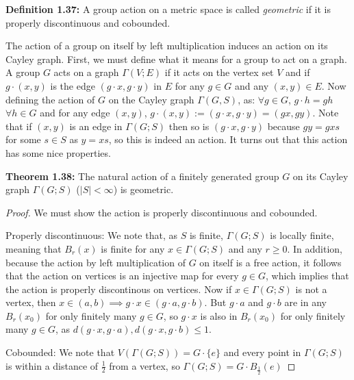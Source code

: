\documentclass[12pt]{article}
\newcommand{\vs}{\vskip10pt}
\begin{document}
	\vs 
	
	\textbf{Definition 1.37: } A group action on a metric space is called \textit{geometric} if it is properly discontinuous and cobounded.
	
	\vs 
	
	The action of a group on itself by left multiplication induces an action on its Cayley graph. First, we must define what it means for a group to act on a graph. A group $G$ acts on a graph $\Gamma(V;E)$ if it acts on the vertex set $V$ and if $g \cdot (x,y)$ is the edge $(g\cdot x, g \cdot y)$ in $E$ for any $g \in G$ and any $(x,y) \in E$. Now defining the action of $G$ on the Cayley graph $\Gamma(G, S)$, as: $\forall g \in G$, $g \cdot h = gh$ $\forall h \in G$ and for any edge $(x,y)$, $g \cdot (x,y) := (g \cdot x, g \cdot y) = (gx, gy)$. Note that if $(x,y)$ is an edge in $\Gamma(G;S)$ then so is $(g \cdot x, g \cdot y)$ because $gy = gxs$ for some $s \in S$ as $y = xs$, so this is indeed an action. It turns out that this action has some nice properties. 
	
	\vs 
	
	\textbf{Theorem 1.38: } The natural action of a finitely generated group $G$ on its Cayley graph $\Gamma(G;S)$ ($\vert S \vert < \infty$) is geometric. 
	
	\begin{proof}
		
		We must show the action is properly discontinuous and cobounded. 
		
		\vs 
		
		Properly discontinuous: We note that, as $S$ is finite, $\Gamma(G;S)$ is locally finite, meaning that $B_r(x)$ is finite for any $x \in \Gamma(G;S)$ and any $r\geq 0$. In addition, because the action by left multiplication of $G$ on itself is a free action, it follows that the action on vertices is an injective map for every $g \in G$, which implies that the action is properly discontinous on vertices. Now if $x \in \Gamma(G;S)$ is not a vertex, then $x \in (a,b) \implies g \cdot x \in (g \cdot a, g \cdot b)$. But $g \cdot a$ and $g \cdot b$ are in any $B_r(x_0)$ for only finitely many $g \in G$, so $g \cdot x$ is also in $B_r(x_0)$ for only finitely many $g \in G$, as $d(g \cdot x, g \cdot a), d(g \cdot x, g \cdot b) \leq 1$.
		
		\vs 
		
		Cobounded: We note that $V(\Gamma(G;S)) = G \cdot \{e\}$ and every point in $\Gamma(G;S)$ is within a distance of $\frac{1}{2}$ from a vertex, so $\Gamma(G;S) = G \cdot B_{\frac{1}{2}}(e)$
		
	\end{proof}
	
\end{document}
